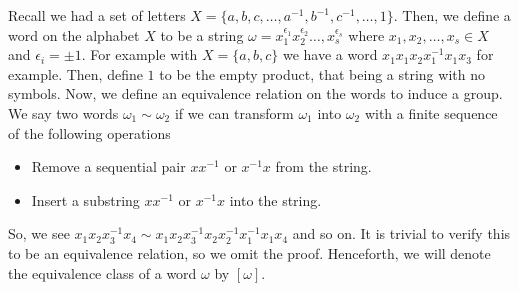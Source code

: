 Recall we had a set of letters \(X = \{a, b, c, \ldots, a^{-1}, b^{-1}, c^{-1}, \ldots,  1 \}\). Then, we define a word on the alphabet \(X\) to be a string \(\omega = x_1^{\epsilon_1} x_2^{\epsilon_2} \ldots, x_{s}^{\epsilon_{s}}\) where \(x_1, x_2, \ldots, x_{s} \in X\) and \(\epsilon _{i} = \pm 1\). For example with \(X = \{a, b, c\} \) we have a word \(x_1 x_1 x_2 x_1^{-1} x_1 x_3\) for example. Then, define \(1\) to be the empty product, that being a string with no symbols. Now, we define an equivalence relation on the words to induce a group.\\
We say two words \(\omega_1 \sim \omega_2\) if we can transform \(\omega_1\) into \(\omega_2\) with a finite sequence of the following operations
\begin{itemize}
	\item Remove a sequential pair \(x x^{-1}\) or \(x^{-1} x\) from the string.
	\item Insert a substring \(x x^{-1}\) or \(x^{-1} x\) into the string.
\end{itemize}
So, we see \(x_1x_2x_3^{-1}x_4 \sim x_1x_2x_3^{-1}x_2x_2^{-1} x_1^{-1} x_1 x_4\) and so on. It is trivial to verify this to be an equivalence relation, so we omit the proof. Henceforth, we will denote the equivalence class of a word \(\omega\) by \(\left[ \omega \right] \).
